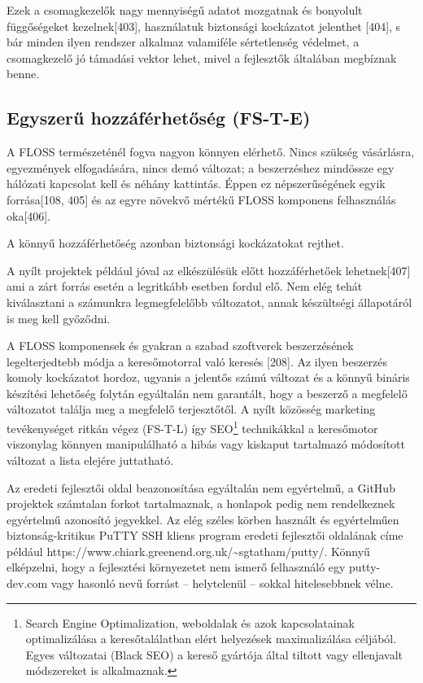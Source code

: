 \documentclass[12pt,magyar,a4paper,oneside]{scrreprt}
\begin{document}
Ezek a csomagkezelők nagy mennyiségű adatot mozgatnak és bonyolult
függőségeket kezelnek{[}403{]}, használatuk biztonsági kockázatot
jelenthet {[}404{]}, s bár minden ilyen rendszer alkalmaz valamiféle
sértetlenség védelmet, a csomagkezelő jó támadási vektor lehet, mivel a
fejlesztők általában megbíznak benne.

\hypertarget{sec:FS-T-E}{%
\subsection{Egyszerű hozzáférhetőség (FS-T-E)}\label{sec:FS-T-E}}

A FLOSS természeténél fogva nagyon könnyen elérhető. Nincs szükség
vásárlásra, egyezmények elfogadására, nincs demó változat; a
beszerzéshez mindössze egy hálózati kapcsolat kell és néhány kattintás.
Éppen ez népszerűségének egyik forrása{[}108, 405{]} és az egyre növekvő
mértékű FLOSS komponens felhasználás oka{[}406{]}.

A könnyű hozzáférhetőség azonban biztonsági kockázatokat rejthet.

A nyílt projektek például jóval az elkészülésük előtt hozzáférhetőek
lehetnek{[}407{]} ami a zárt forrás esetén a legritkább esetben fordul
elő. Nem elég tehát kiválasztani a számunkra legmegfelelőbb változatot,
annak készültségi állapotáról is meg kell győződni.

A FLOSS komponensek és gyakran a szabad szoftverek beszerzésének
legelterjedtebb módja a keresőmotorral való keresés {[}208{]}. Az ilyen
beszerzés komoly kockázatot hordoz, ugyanis a jelentős számú változat és
a könnyű bináris készítési lehetőség folytán egyáltalán nem garantált,
hogy a beszerző a megfelelő változatot találja meg a megfelelő
terjesztőtől. A nyílt közösség marketing tevékenységet ritkán végez
(FS-T-L) így SEO\footnote{Search Engine Optimalization, weboldalak és
  azok kapcsolatainak optimalizálása a keresőtalálatban elért helyezések
  maximalizálása céljából. Egyes változatai (Black SEO) a kereső
  gyártója által tiltott vagy ellenjavalt módszereket is alkalmaznak.}
technikákkal a keresőmotor viszonylag könnyen manipulálható a hibás vagy
kiskaput tartalmazó módosított változat a lista elejére juttatható.

Az eredeti fejlesztői oldal beazonosítása egyáltalán nem egyértelmű, a
GitHub projektek számtalan forkot tartalmaznak, a honlapok pedig nem
rendelkeznek egyértelmű azonosító jegyekkel. Az elég széles körben
használt és egyértelműen biztonság-kritikus PuTTY SSH kliens program
eredeti fejlesztői oldalának címe például
https://www.chiark.greenend.org.uk/\textasciitilde{}sgtatham/putty/.
Könnyű elképzelni, hogy a fejlesztési környezetet nem ismerő felhasználó
egy putty-dev.com vagy hasonló nevű forrást -- helytelenül -- sokkal
hitelesebbnek vélne.
\end{document}
